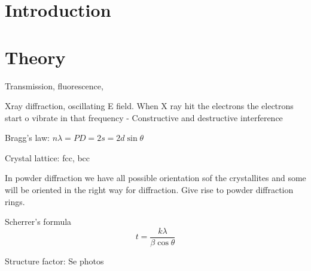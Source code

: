 \section{Introduction}

\section{Theory}
\cite{hofmann2015}

Transmission, fluorescence, 

Xray diffraction, oscillating E field. When X ray hit the electrons the electrons start o vibrate in that frequency
- Constructive and destructive interference 

Bragg's law: $n\lambda=PD=2s=2d\sin\theta$

Crystal lattice: fcc, bcc

In powder diffraction we have all possible orientation sof the crystallites and some will be oriented in the right way for diffraction. Give rise to powder diffraction rings. 

Scherrer's formula
\begin{equation}
    t=\frac{k\lambda}{\beta\cos\theta}
\end{equation}

Structure factor: Se photos 

